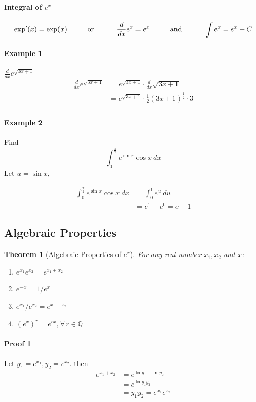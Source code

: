 \documentclass[12pt]{article}
\newcommand\tab[1][1cm]{\hspace*{#1}}
\newtheorem{theorem}{Theorem}
\begin{document}
\paragraph{Integral of $e^x$}
\[
    \exp'(x) = \exp(x) \textrm{\tab or \tab} \frac{d}{dx} e^x = e^x \textrm{\tab and \tab} \int e^x = e^x + C
\]

\paragraph{Example 1} $\frac{d}{dx} e^{\sqrt{3x + 1}}$
\begin{align*} 
    \frac{d}{dx} e^{\sqrt{3x + 1}} &= e^{\sqrt{3x + 1}} \cdot \frac{d}{dx} \sqrt{3x + 1} \\
    &= e^{\sqrt{3x + 1}} \cdot \frac{1}{2} (3x + 1)^{ \frac{1}{2}} \cdot 3 \\
\end{align*}

\paragraph{Example 2} Find
\[
    \int_0^{\frac{\pi}{2}} e^{\sin x} \cos x \: dx
\]
Let $u = \sin x$,

\begin{align*} 
    \int_0^{\frac{\pi}{2}} e^{\sin x} \cos x \: dx &= \int_0^1 e^u \: du \\
    &= e^1 - e^0 = e - 1
\end{align*}

\subsection{Algebraic Properties}
\begin{theorem}[Algebraic Properties of $e^x$]
    For any real number $x_1, x_2$ and $x$:
    \begin{enumerate} 
         \item $e^{x_1}e^{x_2} = e^{x_1 + x_2}$
         \item $e^{-x} = 1/e^x$
         \item $e^{x_1}/e^{x_2} = e^{x_1 - x_2}$
         \item $(e^x)^r = e^{rx}, \forall \, r \in \mathbb{Q}$
    \end{enumerate}
\end{theorem}

\paragraph{Proof 1}
Let $y_1 = e^{x_1}, y_2 = e^{x_2}$. then
\begin{align*} 
    e^{x_1 + x_2} &= e^{\ln y_1 + \ln y_2} \\
    &= e^{\ln y_1 y_2} \\
    &= y_1y_2 = e^{x_1}e^{x_2}
\end{align*}
\end{document}
